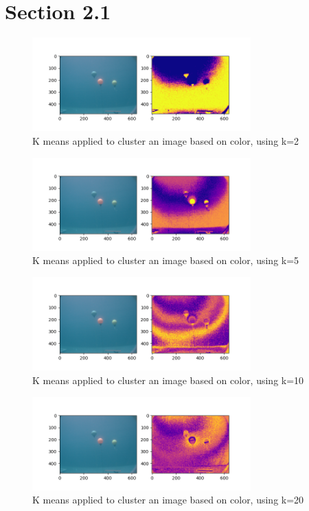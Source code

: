 \documentclass{article}
\begin{document}
\section*{Section 2.1}
\begin{figure}[H]
    \centering
    \includegraphics[width=0.75\textwidth]{11_k_means/2_1_1.png}
    \caption{K means applied to cluster an image based on color, using k=2}
    \label{fig:211}
\end{figure}
\begin{figure}[H]
    \centering
    \includegraphics[width=0.75\textwidth]{11_k_means/2_1_2.png}
    \caption{K means applied to cluster an image based on color, using k=5}
    \label{fig:212}
\end{figure}
\begin{figure}[H]
    \centering
    \includegraphics[width=0.75\textwidth]{11_k_means/2_1_3.png}
    \caption{K means applied to cluster an image based on color, using k=10}
    \label{fig:213}
\end{figure}
\begin{figure}[H]
    \centering
    \includegraphics[width=0.75\textwidth]{11_k_means/2_1_4.png}
    \caption{K means applied to cluster an image based on color, using k=20}
    \label{fig:214}
\end{figure}

    
\end{document}
